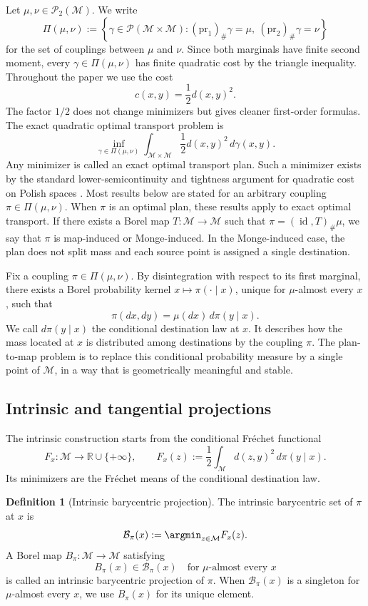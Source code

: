 \documentclass[10pt]{article} %
\theoremstyle{definition}
\newtheorem{definition}[definition]{Definition}
\providecommand{\R}{\mathbb{R}}
\providecommand{\1}{\mathbf{1}}
\providecommand{\sM}{\mathcal{M}}
\DeclareMathOperator{\id}{id}
\begin{document}
Let $\mu,\nu\in\mathcal P_2(\sM)$. We write
\[
\Pi(\mu,\nu)
:=
\left\{\gamma\in\mathcal P(\sM\times\sM):
(\mathrm{pr}_1)_\#\gamma=\mu,
\ (\mathrm{pr}_2)_\#\gamma=\nu
\right\}
\]
for the set of couplings between $\mu$ and $\nu$. Since both marginals have finite second moment, every $\gamma\in\Pi(\mu,\nu)$ has finite quadratic cost by the triangle inequality. Throughout the paper we use the cost
\[
 c(x,y)=\frac12 d(x,y)^2.
\]
The factor $1/2$ does not change minimizers but gives cleaner first-order formulas. The exact quadratic optimal transport problem is
\[
\inf_{\gamma\in\Pi(\mu,\nu)}
\int_{\sM\times\sM}\frac12 d(x,y)^2\,d\gamma(x,y).
\]
Any minimizer is called an exact optimal transport plan. Such a minimizer exists by the standard lower-semicontinuity and tightness argument for quadratic cost on Polish spaces \citep{villani_2009_OptimalTransportOld}. Most results below are stated for an arbitrary coupling $\pi\in\Pi(\mu,\nu)$. When $\pi$ is an optimal plan, these results apply to exact optimal transport. If there exists a Borel map $T:\sM\to\sM$ such that $\pi=(\id,T)_\#\mu$, we say that $\pi$ is {map-induced} or {Monge-induced}. In the Monge-induced case, the plan does not split mass and  each source point is assigned a single destination.

Fix a coupling $\pi\in\Pi(\mu,\nu)$. By disintegration with respect to its first marginal, there exists a Borel probability kernel $x\mapsto \pi(\cdot\mid x)$, unique for $\mu$-almost every $x$, such that
\[
\pi(dx,dy)=\mu(dx)\,d\pi(y\mid x).
\]
We call $d\pi(y\mid x)$ the {conditional destination law} at $x$. It describes how the mass located at $x$ is distributed among destinations by the coupling $\pi$. The plan-to-map problem is to replace this conditional probability measure by a single point of $\sM$, in a way that is geometrically meaningful and stable.





\subsection{Intrinsic and tangential projections}

The intrinsic construction starts from the conditional Fr\'echet functional
\[
F_x:\sM\to\R\cup\{+\infty\},
\qquad
F_x(z):=\frac12\int_{\sM} d(z,y)^2\,d\pi(y\mid x).
\]
Its minimizers are the Fr\'echet means of the conditional destination law.

\begin{definition}[Intrinsic barycentric projection]
The intrinsic barycentric set of $\pi$ at $x$ is
\[
\mathcal B_\pi(x):=\argmin_{z\in\sM} F_x(z).
\]
A Borel map $B_\pi:\sM\to\sM$ satisfying
\[
B_\pi(x)\in\mathcal B_\pi(x)
\quad\text{for }\mu\text{-almost every }x
\]
is called an {intrinsic barycentric projection} of $\pi$. When $\mathcal B_\pi(x)$ is a singleton for $\mu$-almost every $x$, we use $B_\pi(x)$ for its unique element.
\end{definition}
\end{document}
